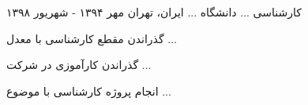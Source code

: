 

\begin{cventries}

  \cventry
    {کارشناسی ...} %
    {دانشگاه ...} %
    {ایران، تهران} %
    {مهر ۱۳۹۴ - شهریور ۱۳۹۸} %
    {
      \begin{cvitems} %
        \item {گذراندن مقطع کارشناسی با معدل ...}
        \item {گذراندن کارآموزی در شرکت ...}
        \item {انجام پروژه کارشناسی با موضوع ...}
      \end{cvitems}
    }
\end{cventries}
